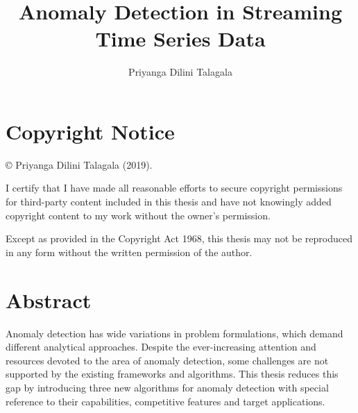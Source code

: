 \documentclass{monashthesis}
\author{Priyanga Dilini Talagala}
\title{Anomaly Detection in Streaming Time Series Data}
\theoremstyle{definition}
\theoremstyle{definition}
\theoremstyle{definition}
\theoremstyle{remark}
\begin{document}

\titlepage

{\sf\tighttoc\doublespacing}

\hypertarget{copyright-notice}{%
\chapter*{Copyright Notice}\label{copyright-notice}}

© Priyanga Dilini Talagala (2019).

I certify that I have made all reasonable efforts to secure copyright permissions for third-party content included in this thesis and have not knowingly added copyright content to my work without the owner's permission.

Except as provided in the Copyright Act 1968, this thesis may not be reproduced in any form without the written permission of the author.

\hypertarget{abstract}{%
\chapter*{Abstract}\label{abstract}}

Anomaly detection has wide variations in problem formulations, which demand different analytical approaches. Despite the ever-increasing attention and resources devoted to the area of anomaly detection, some challenges are not supported by the existing frameworks and algorithms. This thesis reduces this gap by introducing three new algorithms for anomaly detection with special reference to their capabilities, competitive features and target applications.
\end{document}
